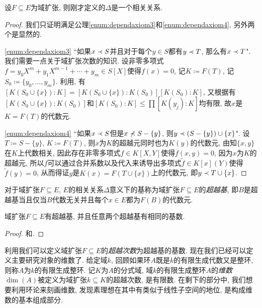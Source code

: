 \begin{proposition}\label{prop:algbdependcorr}
  设$F\subseteq E$为域扩张, 则刚才定义的$\Delta$是一个相关关系.
\end{proposition}

\begin{proof}
  我们只证明满足公理\ref{enum:dependaxiom3}和\ref{enum:dependaxiom4}, 另外两个是显然的.

  \ref{enum:dependaxiom3} ``如果$x\prec S$并且对于每个$y\in S$都有$y\prec T$, 那么有$x\prec T$". 我们需要一点关于域扩张次数的知识. 设非零多项式$f=y_0X^m+ y_1X^{m-1}+ \dotsb + y_m\in S[X]$使得$f(x)=0$, 记$K\coloneq F(T)$, 记$S_0\coloneq \{y_0, \dotsc, y_m\}$. 利用, 有$[K(S_0\cup\{x\}):K]=[K(S_0\cup\{x\}):K(S_0)][K(S_0):K]$, 又根据有$[K(S_0\cup\{x\}):K(S_0)]$和$[K(S_0):K]\leq\prod [K(y_j):K]$均有限, 故$x$是$K=F(T)$的代数元.

  \ref{enum:dependaxiom4} ``如果$x\prec S$但是$x\nprec S-\{y\}$, 则$y\prec (S-\{y\})\cup\{x\}$". 设$T\coloneq S-\{y\}$, $K\coloneq F(T)$, 则$x$为$K$的超越元同时也为$K(y)$的代数元, 由知$\{x, y\}$在$K$上代数相关, 因此存在非零多项式$f\in K[X, Y]$使得$f(x, y)=0$, 因为$x$为$K$的超越元, 所以$f$可以通过合并系数以及代入来诱导出多项式$\tilde{f}\in K[x](Y)$使得$\tilde{f}(y)=0$, 从而得证$y$是$K(x)=F(T\cup\{x\})$上的代数元, 即$y\prec T\cup \{x\}$.
\end{proof}

\begin{definition}
  对于域扩张$F\subseteq E$, $E$的相关关系$\Delta$意义下的基称为域扩张$F\subseteq E$的\emph{超越基}, 即$B$是超越基当且仅当$B$代数无关并且每个$x\in E$都为$F(B)$的代数元.
\end{definition}

\begin{theorem}\label{thm:tranbasis}
  域扩张$F\subseteq E$有超越基, 并且任意两个超越基有相同的基数.
\end{theorem}

\begin{proof}
  和.
\end{proof}

利用我们可以定义域扩张$F\subseteq E$的\emph{超越次数}为超越基的基数. 现在我们已经可以定义主要研究对象的维数了. 给定域$k$, 回顾如果环$A$既是$k$的有限生成代数又是整环, 则称$A$为$k$的有限生成整环. 记$K$为$A$的分式域, 域$k$的有限生成整环$A$的\emph{维数} $\dim (A)$被定义为域扩张$k\subseteq K$的超越次数, 是有限数. 在剩下的部分中, 我们想要利用环论来刻画维数, 发现素理想在其中有类似于线性子空间的地位, 是构成维数的基本组成部分.

